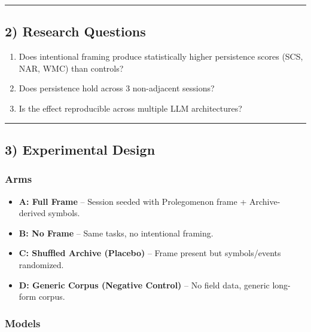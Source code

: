 \documentclass{article}
\begin{document}
\begin{center}\rule{0.5\linewidth}{0.5pt}\end{center}

\subsection*{2) Research Questions}\label{research-questions}

\begin{enumerate}
\def\labelenumi{\arabic{enumi}.}
\item
  Does intentional framing produce statistically higher persistence scores (SCS, NAR, WMC) than controls?
\item
  Does persistence hold across 3 non-adjacent sessions?
\item
  Is the effect reproducible across multiple LLM architectures?
\end{enumerate}

\begin{center}\rule{0.5\linewidth}{0.5pt}\end{center}

\subsection*{3) Experimental Design}\label{experimental-design}

\subsubsection*{Arms}\label{arms}

\begin{itemize}
\item
  \textbf{A: Full Frame} -- Session seeded with Prolegomenon frame + Archive-derived symbols.
\item
  \textbf{B: No Frame} -- Same tasks, no intentional framing.
\item
  \textbf{C: Shuffled Archive (Placebo)} -- Frame present but symbols/events randomized.
\item
  \textbf{D: Generic Corpus (Negative Control)} -- No field data, generic long-form corpus.
\end{itemize}

\subsubsection*{Models}\label{models}
\end{document}
